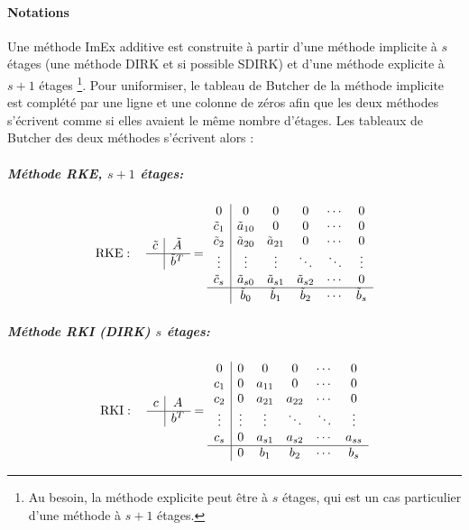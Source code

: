    \paragraph{Notations}%
        Une méthode ImEx additive est construite à partir d'une méthode implicite à $s$ étages (une méthode DIRK et si possible SDIRK) et d'une méthode explicite à $s+1$ étages
        \footnote{Au besoin, la méthode explicite peut être à $s$ étages, qui est un cas particulier d'une méthode à $s+1$ étages.}.
        Pour uniformiser, le tableau de Butcher de la méthode implicite est complété par une ligne et une colonne de zéros afin que les deux méthodes
        s'écrivent comme si elles avaient le même nombre d'étages.
        Les tableaux de Butcher des deux méthodes s'écrivent alors :
        
        \subparagraph{Méthode RKE, $s+1$ étages:}
        \begin{align}
        \text{RKE} : \quad
        \begin{array}{c|c}
        \tilde{c} & \tilde{A} \\
        \hline
        & \tilde{b}^T
        \end{array}
        =
        \begin{array}{c|ccccc}
        0 & 0 & 0 & 0 & \cdots & 0 \\
        \tilde{c}_1 & \tilde{a}_{10} & 0 & 0 & \cdots & 0 \\
        \tilde{c}_2 & \tilde{a}_{20} & \tilde{a}_{21} & 0 & \cdots & 0 \\
        \vdots & \vdots & \vdots & \ddots & \ddots & \vdots \\
        \tilde{c}_s & \tilde{a}_{s0} & \tilde{a}_{s1} & \tilde{a}_{s2} & \cdots & 0 \\
        \hline
        & \tilde{b}_0 & \tilde{b}_1 & \tilde{b}_2 & \cdots & \tilde{b}_s
        \end{array}
        \end{align}
        
        \subparagraph{Méthode RKI (DIRK) $s$ étages:}
        \begin{align}
        \text{RKI} : \quad
        \begin{array}{c|c}
        c & A \\
        \hline
        & b^T
        \end{array}
        =
        \begin{array}{c|ccccc}
        0 & 0 & 0 & 0 & \cdots & 0 \\
        c_1 & 0 & a_{11} & 0 & \cdots & 0 \\
        c_2 & 0 & a_{21} & a_{22} & \cdots & 0 \\
        \vdots & \vdots & \vdots & \ddots & \ddots & \vdots \\
        c_s & 0 & a_{s1} & a_{s2} & \cdots & a_{ss} \\
        \hline
        & 0 & b_1 & b_2 & \cdots & b_s
        \end{array}
        \end{align}
        
